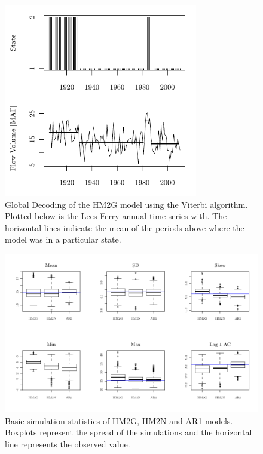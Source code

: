 \documentclass[wrr]{AGUTeX}
\begin{document}

\begin{figure}
\centering
\noindent\includegraphics[width=20pc]{plots/hmm-sim-figure2.pdf}
\caption{Global Decoding of the HM2G model using the Viterbi algorithm. Plotted below is the Lees Ferry annual time series with.  The horizontal lines indicate the mean of the periods above where the model was in a particular state.}\label{fig:decoding}
\end{figure}

\begin{figure}
\centering
\noindent\includegraphics[width=39pc]{plots/hmm-sim-figure3.pdf}
\caption{Basic simulation statistics of HM2G, HM2N and AR1 models. Boxplots represent the spread of the simulations and the horizontal line represents the observed value.}\label{fig:stats}
\end{figure}
\end{document}
